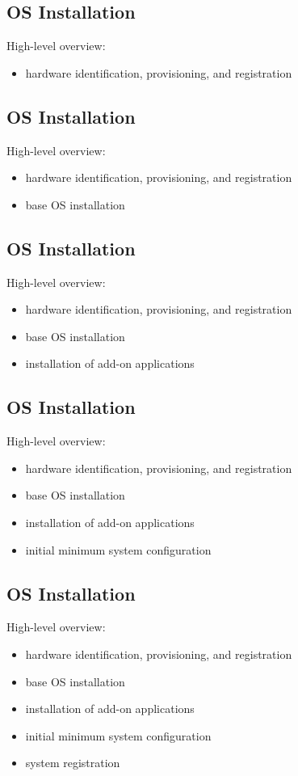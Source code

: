 \documentclass[xga]{xdvislides}
\begin{document}
\subsection{OS Installation}
High-level overview:
\begin{itemize}
	\item hardware identification, provisioning, and registration
\end{itemize}

\subsection{OS Installation}
High-level overview:
\begin{itemize}
	\item hardware identification, provisioning, and registration
	\item base OS installation
\end{itemize}

\subsection{OS Installation}
High-level overview:
\begin{itemize}
	\item hardware identification, provisioning, and registration
	\item base OS installation
	\item installation of add-on applications
\end{itemize}

\subsection{OS Installation}
High-level overview:
\begin{itemize}
	\item hardware identification, provisioning, and registration
	\item base OS installation
	\item installation of add-on applications
	\item initial minimum system configuration
\end{itemize}

\subsection{OS Installation}
High-level overview:
\begin{itemize}
	\item hardware identification, provisioning, and registration
	\item base OS installation
	\item installation of add-on applications
	\item initial minimum system configuration
	\item system registration
\end{itemize}
\end{document}

